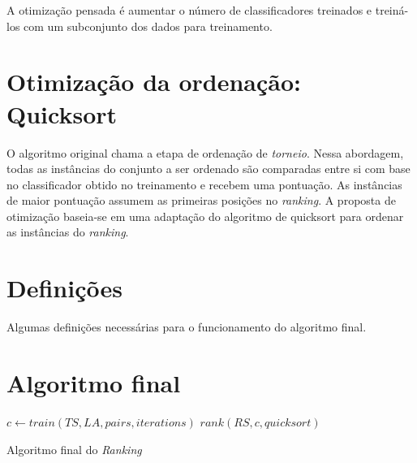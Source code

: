 A otimização pensada é aumentar o número de classificadores treinados e treiná-los com um subconjunto dos dados para treinamento.

\section{Otimização da ordenação: Quicksort}
O algoritmo original chama a etapa de ordenação de \emph{torneio}. Nessa abordagem, todas as instâncias do conjunto a ser ordenado são comparadas entre si com base no classificador obtido no treinamento e recebem uma pontuação. As instâncias de maior pontuação assumem as primeiras posições no \emph{ranking}. A proposta de otimização baseia-se em uma adaptação do algoritmo de quicksort para ordenar as instâncias do \emph{ranking}.

\section{Definições}
Algumas definições necessárias para o funcionamento do algoritmo final.

\section{Algoritmo final}

\begin{algorithm}
\begin{algorithmic}

\STATE $c \gets train(TS, LA, pairs, iterations)$
\STATE $rank(RS, c, quicksort)$

\caption{Algoritmo final do \emph{Ranking}}
\label{alg:ranking}

\end{algorithmic}
\end{algorithm}
